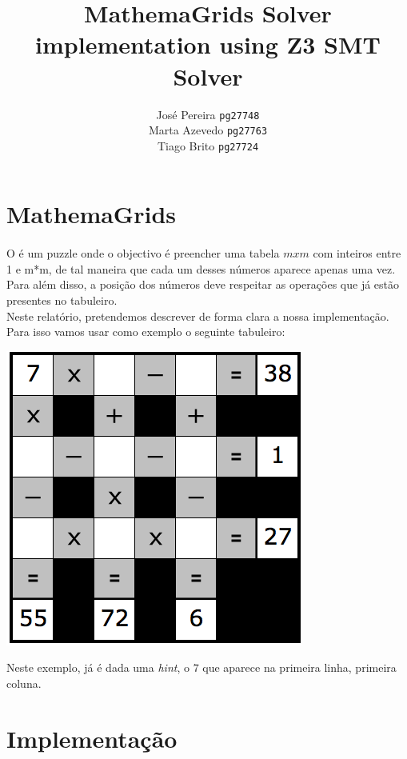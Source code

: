 \documentclass{article}
\title{MathemaGrids Solver\\ implementation using Z3 SMT Solver}
\author{José Pereira \texttt{pg27748} 
		\\ Marta Azevedo \texttt{pg27763}
		              \\ Tiago Brito \texttt{pg27724}}
\begin{document}
\begin{titlepage}
\maketitle
\end{titlepage}

\section{MathemaGrids}

\paragraph{} 
O {} é um puzzle onde o objectivo é preencher uma tabela $mxm$ com inteiros entre 1 e m*m, de tal maneira que cada um desses números aparece apenas uma vez. 
\\

Para além disso, a posição dos números deve respeitar as operações que já estão presentes no tabuleiro.
\\
Neste relatório, pretendemos descrever de forma clara a nossa implementação.
\\

Para isso vamos usar como exemplo o seguinte tabuleiro:
\begin{center}
\includegraphics[scale=0.4]{exemplo_mathemagrids}
\end{center}

Neste exemplo, já é dada uma {\it{hint}}, o $7$ que aparece na primeira linha, primeira coluna.
\newpage
\section{Implementação}
\end{document}
